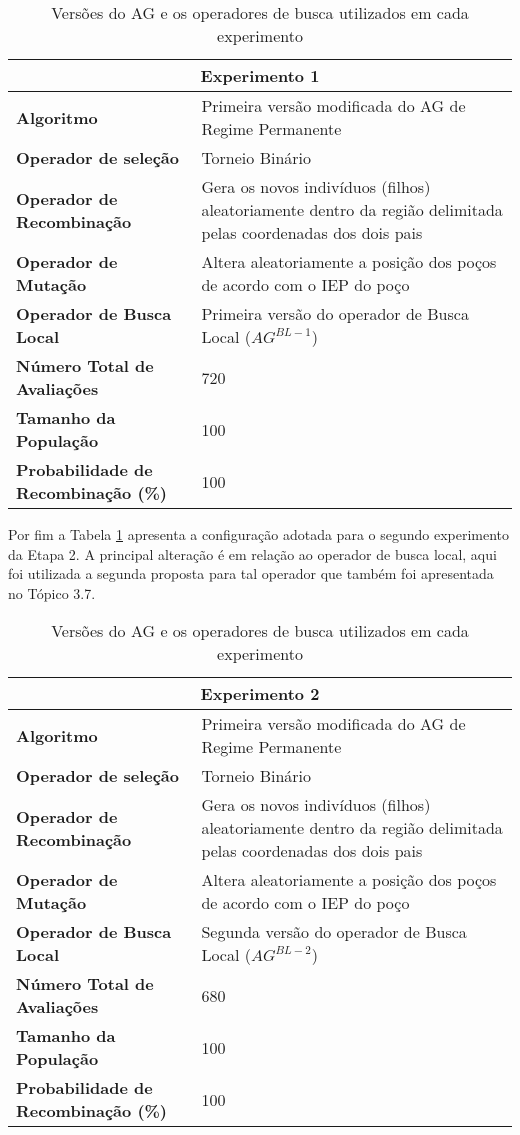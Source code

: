 \begin{table}[H]
\centering
\caption{Versões do AG e os operadores de busca utilizados em cada experimento}
\label{table:con06}
\begin{tabular}{|p{6cm}|p{9cm}|}
\hline

\multicolumn{2}{|c|}{\textbf{Experimento 1}} \\ \hline
\textbf{Algoritmo} & Primeira versão modificada do AG de Regime Permanente  \\ \hline
\textbf{Operador de seleção} & Torneio Binário \\ \hline
\textbf{Operador de Recombinação} & Gera os novos indivíduos (filhos) aleatoriamente dentro da região delimitada pelas coordenadas dos dois pais \\  \hline
\textbf{Operador de Mutação} & Altera aleatoriamente a posição dos poços de acordo com o IEP do poço \\ \hline
\textbf{Operador de Busca Local} & Primeira versão do operador de Busca Local ($AG^{BL-1}$) \\ \hline
\textbf{Número Total de Avaliações} & 720 \\ \hline
\textbf{Tamanho da População} & 100 \\ \hline
\textbf{Probabilidade de Recombinação (\%)} & 100 \\ \hline
\end{tabular}
\end{table}

Por fim a Tabela \ref{table:con06} apresenta a configuração adotada para o segundo experimento da Etapa 2. A principal alteração é em relação ao operador de busca local, aqui foi utilizada a segunda proposta para tal operador que também foi apresentada no Tópico 3.7.

\begin{table}[H]
\centering
\caption{Versões do AG e os operadores de busca utilizados em cada experimento}
\label{table:con07}
\begin{tabular}{|p{6cm}|p{9cm}|}
\hline

\multicolumn{2}{|c|}{\textbf{Experimento 2}} \\ \hline
\textbf{Algoritmo} & Primeira versão modificada do AG de Regime Permanente \\ \hline
\textbf{Operador de seleção} & Torneio Binário \\ \hline
\textbf{Operador de Recombinação} & Gera os novos indivíduos (filhos) aleatoriamente dentro da região delimitada pelas coordenadas dos dois pais \\  \hline
\textbf{Operador de Mutação} & Altera aleatoriamente a posição dos poços de acordo com o IEP do poço \\ \hline
\textbf{Operador de Busca Local} & Segunda versão do operador de Busca Local ($AG^{BL-2}$) \\ \hline
\textbf{Número Total de Avaliações} & 680 \\ \hline
\textbf{Tamanho da População} & 100 \\ \hline
\textbf{Probabilidade de Recombinação (\%)} & 100 \\ \hline
\end{tabular}
\end{table}

